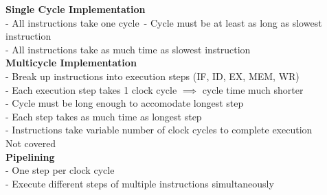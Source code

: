 \documentclass[10pt, a4paper]{article}
\begin{document}
\begin{multicols*}{3}
		\textbf{Single Cycle Implementation}\\
		- All instructions take one cycle\
		- Cycle must be at least as long as slowest instruction\\
		- All instructions take as much time as slowest instruction\\
		
		\textbf{Multicycle Implementation}\\
		- Break up instructions into execution steps (IF, ID, EX, MEM, WR)\\
		- Each execution step takes 1 clock cycle $\implies$ cycle time much shorter\\	
		- Cycle must be long enough to accomodate longest step\\
		- Each step takes as much time as longest step\\
		- Instructions take variable number of clock cycles to complete execution\\
		Not covered\\
		
		\textbf{Pipelining}\\
		- One step per clock cycle\\
		- Execute different steps of multiple instructions simultaneously\\
		
		
		
		
		
				
	\end{multicols*}
\end{document}
